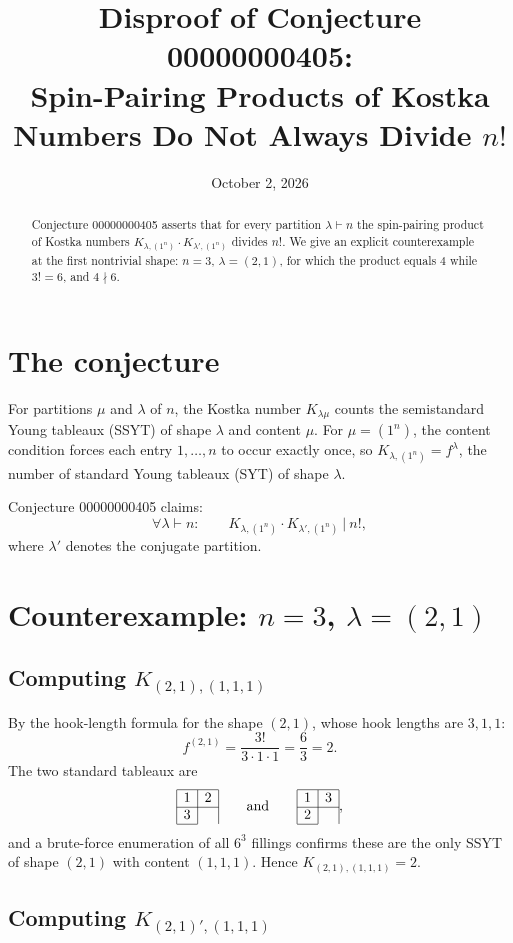 \documentclass[11pt]{article}
\title{Disproof of Conjecture 00000000405:\\
Spin-Pairing Products of Kostka Numbers Do Not Always Divide $n!$}
\author{}
\date{October 2, 2026}
\newcommand{\Kostka}{K}
\newcommand{\shape}{\lambda}
\newcommand{\oneton}{(1^n)}
\newcommand{\YD}[3]{\begin{array}{|c|c|}\hline #1 & #2 \\ \cline{1-2} #3 & \multicolumn{1}{c|}{} \\ \cline{1-1}\end{array}}
\begin{document}
\maketitle

\begin{abstract}
Conjecture 00000000405 asserts that for every partition $\shape \vdash n$ the
spin-pairing product of Kostka numbers
$\Kostka_{\shape,\oneton}\cdot \Kostka_{\shape',\oneton}$
divides $n!$. We give an explicit counterexample at the first nontrivial shape:
$n=3$, $\shape=(2,1)$, for which the product equals $4$ while $3! = 6$, and
$4 \nmid 6$.
\end{abstract}

\section{The conjecture}

For partitions $\mu$ and $\shape$ of $n$, the Kostka number $\Kostka_{\shape\mu}$ counts
the semistandard Young tableaux (SSYT) of shape $\shape$ and content $\mu$. For
$\mu = \oneton$, the content condition forces each entry $1,\dots,n$ to occur exactly
once, so $\Kostka_{\shape,\oneton} = f^{\shape}$, the number of standard Young tableaux
(SYT) of shape $\shape$.

Conjecture 00000000405 claims:
\[
\forall \shape \vdash n:\qquad \Kostka_{\shape,\oneton}\cdot \Kostka_{\shape',\oneton}
\ \big|\ n!,
\]
where $\shape'$ denotes the conjugate partition.

\section{Counterexample: $n=3$, $\shape=(2,1)$}

\subsection{Computing $\Kostka_{(2,1),(1,1,1)}$}

By the hook-length formula for the shape $(2,1)$, whose hook lengths are $3,1,1$:
\[
f^{(2,1)} = \frac{3!}{3\cdot 1 \cdot 1} = \frac{6}{3} = 2.
\]
The two standard tableaux are
\[
\YD{1}{2}{3} \qquad\text{and}\qquad \YD{1}{3}{2},
\]
and a brute-force enumeration of all $6^3$ fillings confirms these are the only SSYT of
shape $(2,1)$ with content $(1,1,1)$. Hence $\Kostka_{(2,1),(1,1,1)} = 2$.

\subsection{Computing $\Kostka_{(2,1)',(1,1,1)}$}
\end{document}
